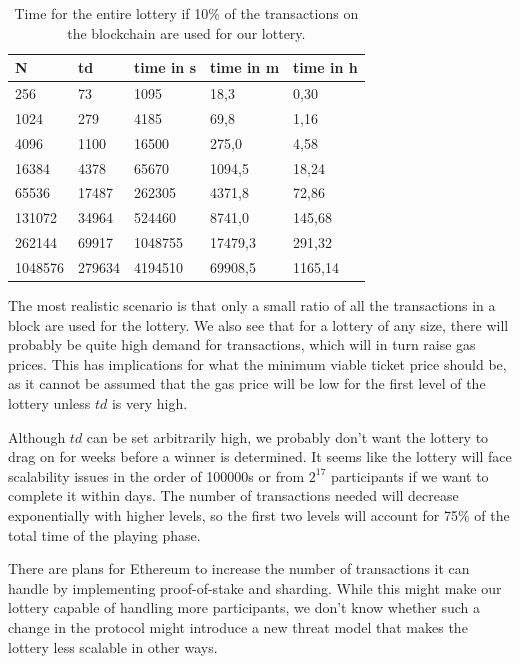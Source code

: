 \begin{table}[h]
\centering
\caption{Time for the entire lottery if 10\% of the transactions on the blockchain are used for our lottery.}
\begin{tabular}{|l|l|l|l|l|}
\hline

N & td & time in s & time in m & time in h \\ \hline
256 & 73 & 1095 & 18,3 & 0,30 \\ \hline
1024 & 279 & 4185 & 69,8 & 1,16 \\ \hline
4096 & 1100 & 16500 & 275,0 & 4,58 \\ \hline
16384 & 4378 & 65670 & 1094,5 & 18,24 \\ \hline
65536 & 17487 & 262305 & 4371,8 & 72,86 \\ \hline
131072 & 34964 & 524460 & 8741,0 & 145,68 \\ \hline
262144 & 69917 & 1048755 & 17479,3 & 291,32 \\ \hline
1048576 & 279634 & 4194510 & 69908,5 & 1165,14 \\ \hline

\end{tabular}
\end{table}

The most realistic scenario is that only a small ratio of all the transactions in a block are used for the lottery. We also see that for a lottery of any size, there will probably be quite high demand for transactions, which will in turn raise gas prices. This has implications for what the minimum viable ticket price should be, as it cannot be assumed that the gas price will be low for the first level of the lottery unless $td$ is very high.

Although $td$ can be set arbitrarily high, we probably don't want the lottery to drag on for weeks before a winner is determined. It seems like the lottery will face scalability issues in the order of 100000s or from $2^{17}$ participants if we want to complete it within days. The number of transactions needed will decrease exponentially with higher levels, so the first two levels will account for 75\% of the total time of the playing phase. 

There are plans for Ethereum to increase the number of transactions it can handle by implementing proof-of-stake and sharding. While this might make our lottery capable of handling more participants, we don't know whether such a change in the protocol might introduce a new threat model that makes the lottery less scalable in other ways.

